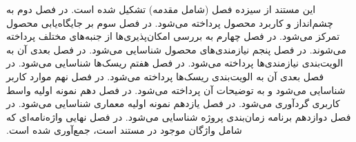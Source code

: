 ‫
‫
‫
‫این مستند از سیزده فصل (شامل مقدمه) تشكیل شده است.
‫در فصل دوم به چشم‌انداز و کاربرد محصول پرداخته می‌شود.
‫در فصل سوم بر جایگاه‌یابی محصول تمرکز می‌شود.
‫در فصل چهارم به بررسی امکان‌پذیری‌ها از جنبه‌های مختلف پرداخته می‌شوند. 
‫در فصل پنجم نیازمندی‌های محصول شناسایی می‌شود. 
‫در فصل بعدی آن به الویت‌بندی نیازمندی‌ها پرداخته می‌شود. 
‫در فصل هفتم ریسک‌ها شناسایی می‌شود. 
‫در فصل بعدی آن به الویت‌بندی ریسک‌ها پرداخته می‌شود. 
‫در فصل نهم موارد کاربر شناسایی می‌شود و به توضیحات آن پرداخته می‌شود. 
‫در فصل دهم نمونه اولیه واسط کاربری گردآوری می‌شود.
‫در فصل یازدهم نمونه اولیه معماری شناسایی می‌شود.
‫در فصل دوازدهم برنامه زمان‌بندی پروژه شناسایی می‌شود. 
‫در فصل نهایی واژه‌نامه‌ای که شامل واژگان موجود در مستند است، جمع‌آوری شده است.